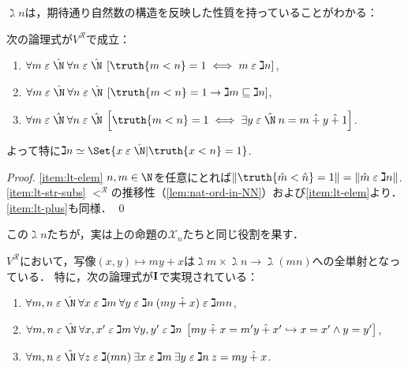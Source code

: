 \documentclass[realisability.tex]{subfiles}
\begin{document}
$\gimel n$は，期待通り自然数の構造を反映した性質を持っていることがわかる：
\begin{lemma}\label{lem:gimel-n-props}
 次の論理式が$V^{\mathcal{R}}$で成立：
 \begin{enumerate}
  \item \label{item:lt-elem}$\forall m \strin \hat{\N}\: \forall n \strin \hat{\N}\: \left[ \truth{m < n} = 1 \iff m \strin \gimel n\right]$,
  \item \label{item:lt-str-subs}$\forall m \strin \hat{\N}\: \forall n \strin \hat{\N}\: \left[ \truth{m < n} = 1 \to \gimel m \sqsubseteq \gimel n\right]$,
  \item \label{item:lt-plus}$\forall m \strin \hat{\N}\: \forall n \strin \hat{\N}\: \left[ \truth{m < n} = 1 \iff \exists y \strin \hat{\N}\: n = m \mathbin{\hat{+}} y \mathbin{\hat{+}} 1\right]$.
 \end{enumerate}
 よって特に$\gimel n \simeq \Set{x \strin \hat{\N} | \truth{x < n} = 1}$.
\end{lemma}
\begin{proof}
 \ref{item:lt-elem} $n, m \in \N$を任意にとれば$\|\truth{\hat{m} < \hat{n}} = 1\| = \|\hat{m} \strin \gimel n\|$.
 \ref{item:lt-str-subs} $<^{\mathcal{R}}$の推移性（\cref{lem:nat-ord-in-NN}）および\ref{item:lt-elem}より．
 \ref{item:lt-plus}も同様． \qed
\end{proof}
この$\gimel n$たちが，実は上の命題の$\mathcal{X}_n$たちと同じ役割を果す．
\begin{lemma}\label{lem:natural-bij-prod}
 $V^{\mathcal{R}}$において，写像$(x, y) \mapsto my + x$は$\gimel m \times \gimel n \to \gimel(mn)$への全単射となっている．
 特に，次の論理式が$\mathsf{\mathbf{I}}$で実現されている：
 \begin{enumerate}
  \item $\forall m, n \strin \hat{\N}\: \forall x \strin \gimel m\: \forall y \strin \gimel n\: (my \mathbin{\hat{+}} x) \strin \gimel mn$,
  \item $\forall m, n \strin \hat{\N}\:
         \forall x, x' \strin \gimel m \: \forall y, y' \strin \gimel n\:
         \left[ my \mathbin{\hat{+}} x = m'y \mathbin{\hat{+}} x' \hookrightarrow x = x'\land y = y' \right]$,
  \item $\forall m,n \strin \hat{\N}\:\forall z \strin \gimel(mn) \:
         \exists x \strin \gimel m \: \exists y \strin \gimel n\:
         z = my \mathbin{\hat{+}} x$.
 \end{enumerate}
\end{lemma}
\end{document}
